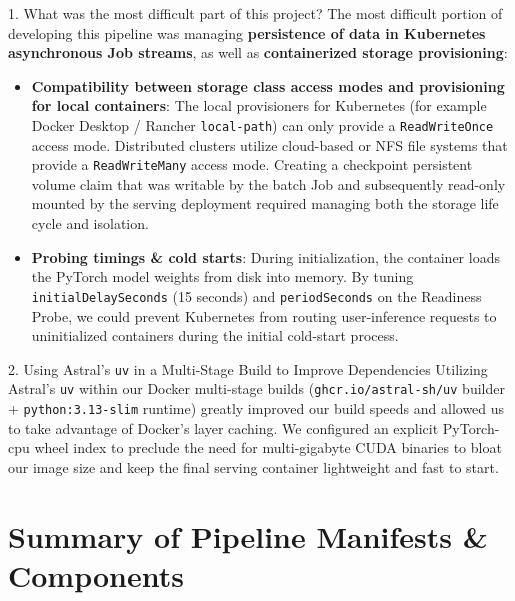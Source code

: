 \documentclass[10pt,a4paper]{article}
\begin{document}
\begin{reflectionbox}{1. What was the most difficult part of this project?}
The most difficult portion of developing this pipeline was managing \textbf{persistence of data in Kubernetes asynchronous Job streams}, as well as \textbf{containerized storage provisioning}:
\begin{itemize}[leftmargin=1.3em]
    \item \textbf{Compatibility between storage class access modes and provisioning for local containers}: The local provisioners for Kubernetes (for example Docker Desktop / Rancher \texttt{local-path}) can only provide a \texttt{ReadWriteOnce} access mode. Distributed clusters utilize cloud-based or NFS file systems that provide a \texttt{ReadWriteMany} access mode. Creating a checkpoint persistent volume claim that was writable by the batch Job and subsequently read-only mounted by the serving deployment required managing both the storage life cycle and isolation.
    \item \textbf{Probing timings \& cold starts}: During initialization, the container loads the PyTorch model weights from disk into memory. By tuning \texttt{initialDelaySeconds} (15 seconds) and \texttt{periodSeconds} on the Readiness Probe, we could prevent Kubernetes from routing user-inference requests to uninitialized containers during the initial cold-start process.
\end{itemize}
\end{reflectionbox}

\vspace{3pt}

\begin{reflectionbox}{2. Using Astral's \texttt{uv} in a Multi-Stage Build to Improve Dependencies}
Utilizing Astral's \texttt{uv} within our Docker multi-stage builds (\texttt{ghcr.io/astral-sh/uv} builder + \texttt{python:3.13-slim} runtime) greatly improved our build speeds and allowed us to take advantage of Docker's layer caching. We configured an explicit PyTorch-cpu wheel index to preclude the need for multi-gigabyte CUDA binaries to bloat our image size and keep the final serving container lightweight and fast to start.
\end{reflectionbox}

\vspace{3pt}

\section{Summary of Pipeline Manifests \& Components}
\end{document}
